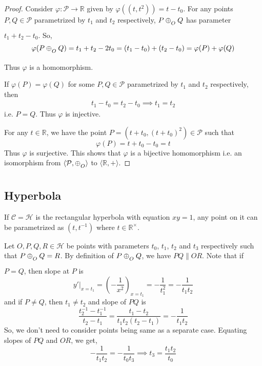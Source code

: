 \begin{proof}
    Consider $\varphi:\mathcal{P} \to \mathbb{R}$ given by
    $\varphi((t,t^2)) = t - t_0$. For any points
    $P,Q\in\mathcal{P}$ parametrized by $t_1$ and $t_2$ respectively,
    $P \conop Q$ has parameter $t_1 + t_2 - t_0$. So,
    \[
        \varphi(P \conop Q) = t_1 + t_2 - 2t_0 = (t_1 - t_0) + (t_2 - t_0)
        = \varphi(P) + \varphi(Q)
    \]
    Thus $\varphi$ is a homomorphism.
    \vspace{1ex}

    \noindent
    If $\varphi(P)=\varphi(Q)$ for some $P,Q\in\mathcal{P}$ parametrized by $t_1$
    and $t_2$ respectively, then
    \begin{align*}
        t_1 - t_0 = t_2 - t_0 \implies t_1 = t_2
    \end{align*}
    i.e. $P=Q$. Thus $\varphi$ is injective.
    \vspace{1ex}

    \noindent
    For any $t \in \mathbb{R}$, we have the point
    $P=(t + t_0,(t + t_0)^2) \in \mathcal{P}$ such that
    \[ \varphi(P) = t + t_0 - t_0 = t \]
    Thus $\varphi$ is surjective. This shows that $\varphi$ is a bijective
    homomorphism i.e. an isomorphism from $\langle \mathcal{P},\conop \rangle$ to
    $\langle \mathbb{R},+ \rangle$.
\end{proof}

\subsection*{Hyperbola}

If $\mathcal{C}=\mathcal{H}$ is the rectangular hyperbola with equation $xy=1$,
any point on it can be parametrized as $(t,t^{-1})$ where $t\in\mathbb{R}^\times$.
\vspace{1ex}

Let $O,P,Q,R\in\mathcal{H}$ be points with parameters $t_0$, $t_1$, $t_2$ and
$t_3$ respectively such that $P \conop Q = R$. By definition of $P \conop Q$, we
have $PQ \parallel OR$. Note that if $P=Q$, then slope at $P$ is
\[
    y'|_{x=t_1} = \left(-\frac{1}{x^2}\right)_{x=t_1}
    = -\frac{1}{t_1^2} = -\frac{1}{t_1 t_2}
\]
and if $P \neq Q$, then $t_1 \neq t_2$ and slope of $PQ$ is 
\[
    \frac{t_2^{-1}-t_1^{-1}}{t_2-t_1} = \frac{t_1 - t_2}{t_1 t_2 (t_2 - t_1)}
    = -\frac{1}{t_1 t_2}
\]
So, we don't need to consider points being same as a separate case. Equating
slopes of $PQ$ and $OR$, we get,
\[ -\frac{1}{t_1 t_2} = -\frac{1}{t_0 t_3} \implies t_3 = \frac{t_1 t_2}{t_0} \]


